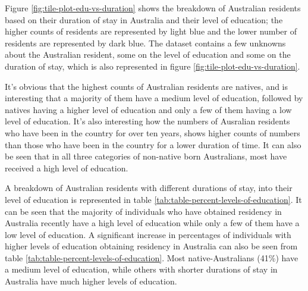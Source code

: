 \documentclass[11pt,a4paper,]{article}
\begin{document}
Figure \ref{fig:tile-plot-edu-vs-duration} shows the breakdown of Australian residents based on their duration of stay in Australia and their level of education; the higher counts of residents are represented by light blue and the lower number of residents are represented by dark blue. The dataset contains a few unknowns about the Australian resident, some on the level of education and some on the duration of stay, which is also represented in figure \ref{fig:tile-plot-edu-vs-duration}.

It's obvious that the highest counts of Australian residents are natives, and is interesting that a majority of them have a medium level of education, followed by natives having a higher level of education and only a few of them having a low level of education.
It's also interesting how the numbers of Ausralian residents who have been in the country for over ten years, shows higher counts of numbers than those who have been in the country for a lower duration of time. It can also be seen that in all three categories of non-native born Australians, most have received a high level of education.

\begin{table}[H]

\caption{\label{tab:table-percent-levels-of-education}Percentages of Australian residents with different levels of education over each category of duration of stay}
\centering
{}
\end{table}

A breakdown of Australian residents with different durations of stay, into their level of education is represented in table \ref{tab:table-percent-levels-of-education}. It can be seen that the majority of individuals who have obtained residency in Australia recently have a high level of education while only a few of them have a low level of education. A significant increase in percentages of individuals with higher levels of education obtaining residency in Australia can also be seen from table \ref{tab:table-percent-levels-of-education}. Most native-Australians (41\%) have a medium level of education, while others with shorter durations of stay in Australia have much higher levels of education.
\end{document}
